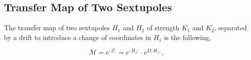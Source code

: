 
%
%
%
%
%
%
%
%



\subsection{Transfer Map of Two Sextupoles}
\label{appendix:transfer_map:two_sextupoles}

The transfer map of two sextupoles $H_1$ and $H_2$ of strength $K_1$ and $K_2$, separated by a drift
to introduce a change of coordinates in $H_1$ is the following,

\begin{equation}
    \mathcal{M} = e^{:Z:} = e^{:H_{2}:} \cdot e^{D:H_{1}:},
\end{equation}

